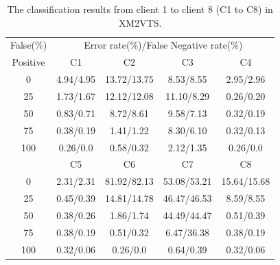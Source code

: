 \begin{table}
\begin{center}
\begin{tabular}{|c||c|c|c|c|}
\hline
{False($\%$)}&\multicolumn{4}{c|}{Error rate($\%$)/False Negative rate($\%$)}\\
\cline{2-5}
{Positive}&{C1}&{C2}&{C3}&{C4}\\
\hline
{0}&{4.94/4.95}&{13.72/13.75}&{8.53/8.55}&{2.95/2.96}\\
{25}&{1.73/1.67}&{12.12/12.08}&{11.10/8.29}&{0.26/0.20}\\
{50}&{0.83/0.71}&{8.72/8.61}&{9.58/7.13}&{0.32/0.19}\\
{75}&{0.38/0.19}&{1.41/1.22}&{8.30/6.10}&{0.32/0.13}\\
{100}&{0.26/0.0}&{0.58/0.32}&{2.12/1.35}&{0.26/0.0}\\
\cline{2-5}
\cline{2-5}
&{C5}&{C6}&{C7}&{C8}\\
\cline{2-5}
{0}&{2.31/2.31}&{81.92/82.13}&{53.08/53.21}&{15.64/15.68}\\
{25}&{0.45/0.39}&{14.81/14.78}&{46.47/46.53}&{8.59/8.55}\\
{50}&{0.38/0.26}&{1.86/1.74}&{44.49/44.47}&{0.51/0.39}\\
{75}&{0.38/0.19}&{0.51/0.32}&{6.47/36.38}&{0.38/0.19}\\
{100}&{0.32/0.06}&{0.26/0.0}&{0.64/0.39}&{0.32/0.06}\\
\hline
\end{tabular}
\caption{The classification results from client 1 to client 8 (C1 to C8) in XM2VTS.}
\label{tab:SVMResults}
\end{center}
\end{table}

